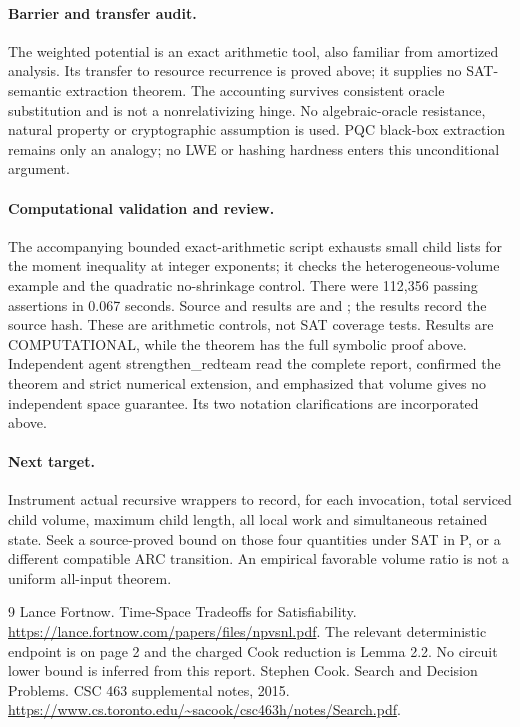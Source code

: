 \documentclass[11pt]{article}
\begin{document}
\paragraph{Barrier and transfer audit.}
The weighted potential is an exact arithmetic tool, also familiar from
amortized analysis. Its transfer to resource recurrence is proved above;
it supplies no SAT-semantic extraction theorem. The accounting survives
consistent oracle substitution and is not a nonrelativizing hinge.
No algebraic-oracle resistance, natural property or cryptographic
assumption is used. PQC black-box extraction remains only an analogy;
no LWE or hashing hardness enters this unconditional argument.

\paragraph{Computational validation and review.}
The accompanying bounded exact-arithmetic script exhausts small child
lists for the moment inequality at integer exponents; it checks the
heterogeneous-volume example and the quadratic no-shrinkage control.
There were 112,356 passing assertions in 0.067 seconds. Source and results
are  and
; the results record the source hash.
These are arithmetic controls, not SAT coverage tests. Results are
COMPUTATIONAL, while the theorem has the full symbolic proof above.
Independent agent strengthen\_redteam read the complete report, confirmed
the theorem and strict numerical extension, and emphasized that volume
gives no independent space guarantee. Its two notation clarifications
are incorporated above.

\paragraph{Next target.}
Instrument actual recursive wrappers to record, for each invocation,
total serviced child volume, maximum child length, all local work and
simultaneous retained state. Seek a source-proved bound on those four
quantities under SAT in P, or a different compatible ARC transition.
An empirical favorable volume ratio is not a uniform all-input theorem.

\begin{thebibliography}{9}
 Lance Fortnow. Time-Space Tradeoffs for Satisfiability.
\url{https://lance.fortnow.com/papers/files/npvsnl.pdf}.
The relevant deterministic endpoint is on page 2 and the charged Cook
reduction is Lemma 2.2. No circuit lower bound is inferred from this report.
 Stephen Cook. Search and Decision Problems.
CSC 463 supplemental notes, 2015.
\url{https://www.cs.toronto.edu/~sacook/csc463h/notes/Search.pdf}.
\end{thebibliography}
\end{document}
